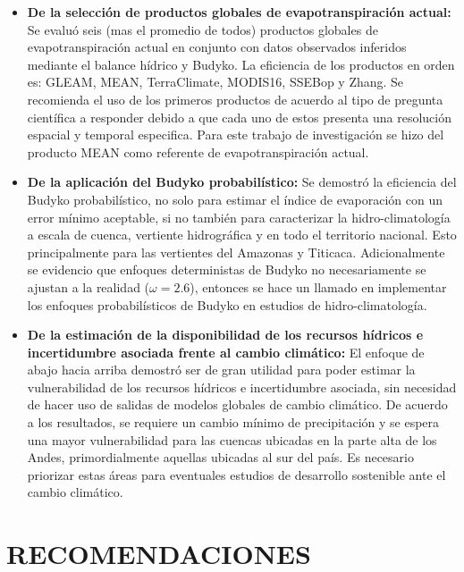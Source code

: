 \documentclass[12pt]{article}
\begin{document}
\begin{itemize}
    \item \textbf{De la selección de productos globales de evapotranspiración actual:} Se evaluó seis (mas el promedio de todos) productos globales de evapotranspiración actual en conjunto con datos observados inferidos mediante el balance hídrico y Budyko. La eficiencia de los productos en orden es: GLEAM, MEAN, TerraClimate, MODIS16, SSEBop y Zhang. Se recomienda el uso de los primeros productos de acuerdo al tipo de pregunta científica a responder debido a que cada uno de estos presenta una resolución espacial y temporal especifica. Para este trabajo de investigación se hizo del producto MEAN como referente de evapotranspiración actual.
    
    \item \textbf{De la aplicación del Budyko probabilístico:}
    Se demostró la eficiencia del Budyko probabilístico, no solo para estimar el índice de evaporación con un error mínimo aceptable, si no también para caracterizar la hidro-climatología a escala de cuenca, vertiente hidrográfica y en todo el territorio nacional. Esto principalmente para las vertientes del Amazonas y Titicaca. Adicionalmente se evidencio que enfoques deterministas de Budyko no necesariamente se ajustan a la realidad ($\omega = 2.6$), entonces se hace un llamado en implementar los enfoques probabilísticos de Budyko en estudios de hidro-climatología.
    
    \item \textbf{De la estimación de la disponibilidad de los recursos hídricos e incertidumbre asociada frente al cambio climático:} El enfoque de abajo hacia arriba demostró ser de gran utilidad para poder estimar la vulnerabilidad de los recursos hídricos e incertidumbre asociada, sin necesidad de hacer uso de salidas de modelos globales de cambio climático. De acuerdo a los resultados, se requiere un cambio mínimo de precipitación y se espera una mayor vulnerabilidad para las cuencas ubicadas en la parte alta de los Andes, primordialmente aquellas ubicadas al sur del país. Es necesario priorizar estas áreas para eventuales estudios de desarrollo sostenible ante el cambio climático.
    
\end{itemize}


\clearpage
\vspace*{0.5mm}
\section{RECOMENDACIONES}
\end{document}

